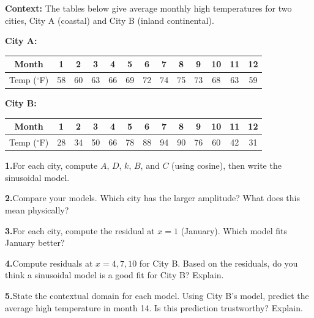 \documentclass[10pt]{article}
\begin{document}
\begin{tcolorbox}[colback=white, colframe=black!40,
    title=\textbf{Tier E --- Extend},
    fonttitle=\bfseries, arc=2mm, left=3mm, right=3mm, top=2mm, bottom=2mm]

\textbf{Context:} The tables below give average monthly high temperatures for two
cities, City A (coastal) and City B (inland continental).

\vspace{4pt}
\textbf{City A:}
\begin{center}
\renewcommand{\arraystretch}{1.3}
\small
\begin{tabular}{|c|c|c|c|c|c|c|c|c|c|c|c|c|}
\hline
Month & 1 & 2 & 3 & 4 & 5 & 6 & 7 & 8 & 9 & 10 & 11 & 12 \\
\hline
Temp (${}^\circ$F) & 58 & 60 & 63 & 66 & 69 & 72 & 74 & 75 & 73 & 68 & 63 & 59 \\
\hline
\end{tabular}
\end{center}

\vspace{4pt}
\textbf{City B:}
\begin{center}
\renewcommand{\arraystretch}{1.3}
\small
\begin{tabular}{|c|c|c|c|c|c|c|c|c|c|c|c|c|}
\hline
Month & 1 & 2 & 3 & 4 & 5 & 6 & 7 & 8 & 9 & 10 & 11 & 12 \\
\hline
Temp (${}^\circ$F) & 28 & 34 & 50 & 66 & 78 & 88 & 94 & 90 & 76 & 60 & 42 & 31 \\
\hline
\end{tabular}
\end{center}

\vspace{6pt}
\textbf{1.}\quad For each city, compute $A$, $D$, $k$, $B$, and $C$ (using cosine), then
write the sinusoidal model.

\vspace{4pt}
\textbf{2.}\quad Compare your models. Which city has the larger amplitude? What does this
mean physically?

\vspace{4pt}
\textbf{3.}\quad For each city, compute the residual at $x = 1$ (January). Which model fits
January better?

\vspace{4pt}
\textbf{4.}\quad Compute residuals at $x = 4, 7, 10$ for City B. Based on the residuals,
do you think a sinusoidal model is a good fit for City B? Explain.

\vspace{4pt}
\textbf{5.}\quad State the contextual domain for each model. Using City B's model, predict
the average high temperature in month 14. Is this prediction trustworthy? Explain.

\end{tcolorbox}
\end{document}
